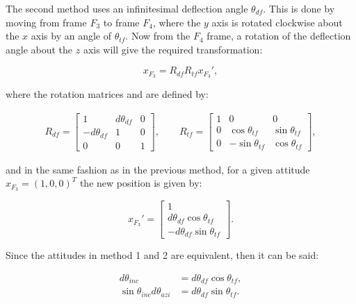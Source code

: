 The second method uses an infinitesimal deflection angle $\theta_{df}$. This is done by moving from frame $F_3$ to frame $F_4$, where the $y$ axis is rotated clockwise about the $x$ axis by an angle of $\theta_{tf}$. Now from the $F_4$ frame, a rotation of the deflection angle about the $z$ axis will give the required transformation:

\begin{equation}
	x_{F_3} = R_{df} R_{tf} x_{F_3}',
\end{equation}

where the rotation matrices  and  are defined by:

\begin{gather*}
	R_{df} = 
	\begin{bmatrix}
		1 & d\theta_{df} & 0 \\
		-d\theta_{df} & 1 & 0 \\
		0 & 0 & 1
	\end{bmatrix}, \qquad
	R_{tf} = 
	\begin{bmatrix}
		1 & 0 & 0 \\
		0 & \cos{\theta_{tf}} & \sin{\theta_{tf}} \\
		0 & -\sin{\theta_{tf}} & \cos{\theta_{tf}}
	\end{bmatrix} ,	
\end{gather*}

and in the same fashion as in the previous method, for a given attitude $x_{F_3} = (1,0,0)^T$ the new position is given by:

\begin{equation}
	x_{F_3}' = 
		\begin{bmatrix}
		1 \\
		d\theta_{df}\cos{\theta_{tf}}\\
		-d\theta_{df}\sin{\theta_{tf}}
	\end{bmatrix}.
\end{equation}

Since the attitudes in method 1 and 2 are equivalent, then it can be said:

\begin{align}\label{eq:2methods}
	d\theta_{inc}  &= d\theta_{df}\cos{\theta_{tf}}, \nonumber \\
	\sin{\theta_{inc}}d\theta_{azi} &= d\theta_{df}\sin{\theta_{tf}}.
\end{align}

